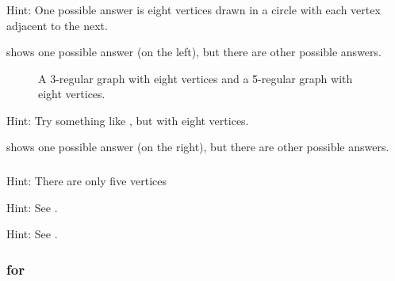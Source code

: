 \subsubsection*{ \answers}
\begin{apart}
    \item Hint: One possible answer is eight vertices drawn in a circle with each vertex adjacent to the next.
    \item {} shows one possible answer (on the left), but there are other possible answers.

    \begin{figure}[hbtp]
        \centering
        
        \caption{A 3-regular graph with eight vertices and a 5-regular graph with eight vertices.}
        \label{fig_regular8_answer}
    \end{figure}

    \item Hint: Try something like , but with eight vertices.
    \item {} shows one possible answer (on the right), but there are other possible answers.
\end{apart}

\subsubsection*{ \answers}
\begin{apart}
    \item Hint: There are only five vertices
    \item Hint: See .
    \item Hint: See .
\end{apart}


\subsubsection{\answers for  \substdgraphs}

